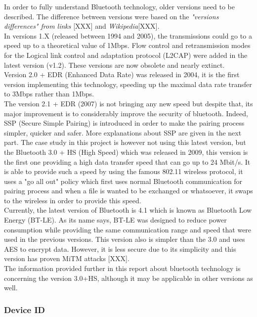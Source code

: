 In order to fully understand Bluetooth technology, older versions need to be described. The difference between versions were based on the \textit{"versions differences" from links} [XXX] and \textit{Wikipedia}[XXX].\\
In versions 1.X (released between 1994 and 2005), the transmissions could go to a speed up to a theoretical value of 1Mbps. Flow control and retransmission modes for the Logical link control and adaptation protocol (L2CAP) were added in the latest version (v1.2). These versions are now obsolete and nearly extinct.\\
Version 2.0 + EDR (Enhanced Data Rate) was released in 2004, it is the first version implementing this technology, speeding up the maximal data rate transfer to 3Mbps rather than 1Mbps.\\
The version 2.1 + EDR (2007) is not bringing any new speed but despite that, its major improvement is to considerably improve the security of bluetooth. Indeed, SSP (Secure Simple Pairing) is introduced in order to make the pairing process simpler, quicker and safer. More explanations about SSP are given in the next part.\newpage
The case study in this project is however not using this latest version, but the Bluetooth 3.0 + HS (High Speed) which was released in 2009, this version is  the first one providing a high data transfer speed that can go up to 24 Mbit/s. It is able to provide such a speed by using the famous 802.11 wireless protocol, it uses a "go all out" policy which first uses normal Bluetooth communication for pairing process and when a file is wanted to be exchanged or whatsoever,  it swaps to the wireless in order to provide this speed.\\
Currently, the latest version of Bluetooth is 4.1 which is known as Bluetooth Low Energy (BT-LE). As its name says, BT-LE was designed to reduce power consumption while providing the same communication range and speed that were used in the previous versions. This version also is simpler than the 3.0 and uses AES to encrypt data. However, it is less secure due to its simplicity and this version has proven MiTM attacks [XXX].\\
The information provided further in this report about bluetooth technology is concerning the version 3.0+HS, although it may be applicable in other versions as well.

\subsubsection{Device ID}


